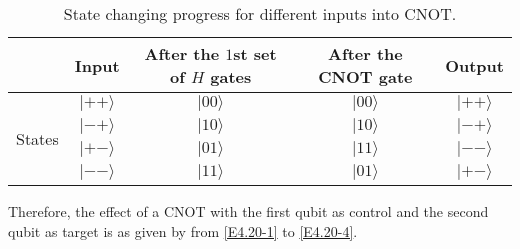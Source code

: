 \documentclass[en]{sol-man}
\begin{document}
\begin{pf}
\begin{table}[h]
        \centering
        \caption{State changing progress for different inputs into CNOT.}
        \label{E4.20-table}
        \begin{tabular}{|c|c|c|c|c|}
        \hline
        & Input & After the $1$st set of $H$ gates & After the CNOT gate & Output \\ \hline
        \multirow{4}{*}{States} & $\lvert++\rangle$ & $\lvert 00\rangle$ & $\lvert 00\rangle$ & $\lvert++\rangle$ \\ \cline{2-5}
        & $\lvert-+\rangle$ & $\lvert 10\rangle$ & $\lvert 10\rangle$ & $\lvert-+\rangle$ \\ \cline{2-5} 
        & $\lvert+-\rangle$ & $\lvert 01\rangle$ & $\lvert 11\rangle$ & $\lvert--\rangle$ \\ \cline{2-5}
        & $\lvert--\rangle$ & $\lvert 11\rangle$ & $\lvert 01\rangle$ & $\lvert+-\rangle$ \\ \hline
        \end{tabular}
    \end{table}

    Therefore, the effect of a CNOT with the first qubit as control and the second qubit as target is as given by from \eqref{E4.20-1} to \eqref{E4.20-4}.
\end{pf}
\end{document}
